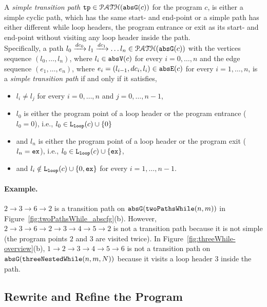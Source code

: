 \begin{defn}
  \label{def:tpath}
A \emph{simple transition path}
$\mathtt{tp} \in \mathcal{PATH}(\mathtt{abs}{\mathtt{G}}(c))$ for the program $c$, is either a simple cyclic path, which has the same start- and end-point
or a simple path has either different while loop headers, the program entrance or exit as its start- and end-point
without visiting any loop header inside the path.
\\
Specifically, a path $l_0 \xrightarrow{dc_0} l_1 \xrightarrow{dc_1} \ldots l_n \in \mathcal{PATH}(\mathtt{abs}{\mathtt{G}}(c))$ with the
vertices sequence $(l_0, \ldots, l_n)$, where $l_i \in \mathtt{abs}{\mathtt{V}}(c)$ for every $i = 0, \ldots, n$ and
%
the edge sequence $(e_1, \ldots, e_n)$, where $e_i = (l_{i - 1}, dc_i, l_{i}) \in \mathtt{abs}{\mathtt{E}}(c)$ for every $i = 1, \ldots, n$,
%
is a \emph{simple transition path} if and only if it satisfies,
\begin{itemize}
  \item $l_i \neq l_j$ for every $i = 0, \ldots, n$ and $j = 0, \ldots, {n - 1}$,
  \item $l_0$ is either the program point of a loop header or the program entrance ($l_0 = 0$),
  i.e., $l_0 \in \mathtt{L}_{\mathtt{loop}}(c) \cup \{ 0 \}$
  \item and $l_n$ is either the program point of a loop header or the program exit ($l_n = \mathtt{ex}$),
  i.e., $l_0 \in \mathtt{L}_{\mathtt{loop}}(c) \cup \{ \mathtt{ex} \}$,
  \item and $l_i \notin \mathtt{L}_{\mathtt{loop}}(c) \cup \{ 0, \mathtt{ex} \}$ for every $i = 1, \ldots, n-1$.
\end{itemize}
\end{defn}

\paragraph{Example.}
$2 \to 3 \to 6 \to 2$ is a transition path on $\mathtt{abs}{\mathtt{G}}(\mathtt{twoPathsWhile}(n, m))$ in Figure~\ref{fig:twoPathsWhile_abscfg}(b).
However, $2 \to 3 \to 6 \to 2 \to 3 \to 4 \to 5 \to 2$ is not a transition path because it is not simple (the program points $2$ and $3$ are visited twice).
In Figure~\ref{fig:threeWhile-overview}(b), $1 \to 2 \to 3 \to 4 \to 5 \to 6$ is not a transition path on $\mathtt{abs}{\mathtt{G}}(\mathtt{threeNestedWhile}(n, m, N))$ because it visits a loop header $3$ inside the path.

\subsection{Rewrite and Refine the Program}
